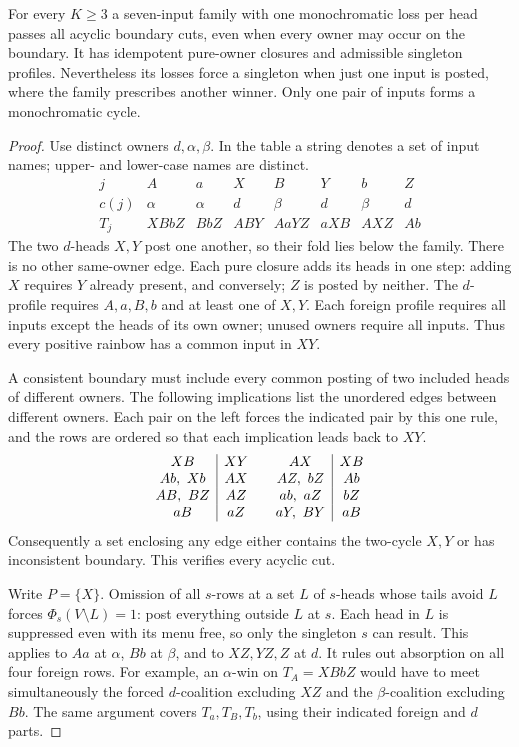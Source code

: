 \begin{proposition}
\label{core:prop:monochromatic-cut-obstruction}
For every $K\ge3$ a seven-input family with one monochromatic loss per
head passes all acyclic boundary cuts, even when every owner may occur
on the boundary. It has idempotent pure-owner closures and admissible
singleton profiles. Nevertheless its losses force a singleton when
just one input is posted, where the family prescribes another winner.
Only one pair of inputs forms a monochromatic cycle.
\end{proposition}
\begin{proof}
Use distinct owners $d,\alpha,\beta$. In the table a string denotes
a set of input names; upper- and lower-case names are distinct.
\[
\begin{array}{c|ccccccc}
j&A&a&X&B&Y&b&Z\\ \hline
c(j)&\alpha&\alpha&d&\beta&d&\beta&d\\
T_j&XBbZ&BbZ&ABY&AaYZ&aXB&AXZ&Ab
\end{array}
\]
The two $d$-heads $X,Y$ post one another, so their fold lies below
the family. There is no other same-owner edge. Each pure closure
adds its heads in one step: adding $X$ requires $Y$ already present,
and conversely; $Z$ is posted by neither. The $d$-profile requires
$A,a,B,b$ and at least one of $X,Y$. Each foreign profile requires
all inputs except the heads of its own owner; unused owners require
all inputs. Thus every positive rainbow has a common input in $XY$.

A consistent boundary must include every common posting of two
included heads of different owners. The following implications
list the unordered edges between different owners. Each pair on
the left forces the indicated pair by this one rule, and the rows
are ordered so that each implication leads back to $XY$.
\[
\begin{array}{c|c@{\qquad}c|c}
 XB&XY & AX&XB\\
 Ab,\ Xb&AX & AZ,\ bZ&Ab\\
 AB,\ BZ&AZ & ab,\ aZ&bZ\\
 aB&aZ & aY,\ BY&aB
\end{array}
\]
Consequently a set enclosing any edge either contains the two-cycle
$X,Y$ or has inconsistent boundary. This verifies every acyclic cut.

Write $P=\{X\}$. Omission of all $s$-rows at a set $L$ of $s$-heads
whose tails avoid $L$ forces $\Phi_s(V\setminus L)=1$: post everything
outside $L$ at $s$. Each head in $L$ is suppressed even with its
menu free, so only the singleton $s$ can result. This applies to
$Aa$ at $\alpha$, $Bb$ at $\beta$, and to $XZ,YZ,Z$ at $d$.
It rules out absorption on all four foreign rows. For example, an
$\alpha$-win on $T_A=XBbZ$ would have to meet simultaneously the
forced $d$-coalition excluding $XZ$ and the $\beta$-coalition
excluding $Bb$. The same argument covers $T_a,T_B,T_b$, using their
indicated foreign and $d$ parts.


\end{proof}
